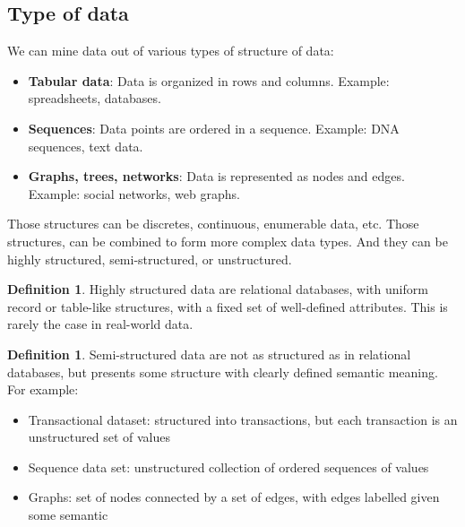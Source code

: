 \documentclass[12pt, openany]{report}
\theoremstyle{definition}
\newtheorem{definition}[thm]{Definition}
\begin{document}
\subsection{Type of data}
We can mine data out of various types of structure of data:
\begin{itemize}
    \item \textbf{Tabular data}: Data is organized in rows and columns. Example: spreadsheets, databases.
    \item \textbf{Sequences}: Data points are ordered in a sequence. Example: DNA sequences, text data.
    \item \textbf{Graphs, trees, networks}: Data is represented as nodes and edges. Example: social networks, web graphs.
\end{itemize}
Those structures can be discretes, continuous, enumerable data, etc. Those structures, can be combined to form more complex data types. And they can be highly structured, semi-structured, or unstructured.
\begin{definition}
    Highly structured data are relational databases, with uniform record or table-like structures, with a fixed set of well-defined attributes. This is rarely the case in real-world data.
\end{definition}
\begin{definition}
    Semi-structured data are not as structured as in relational databases, but presents some structure with clearly defined semantic meaning. For example:
    \begin{itemize}
        \item Transactional dataset: structured into transactions, but each transaction is an unstructured set of values
        \item Sequence data set: unstructured collection of ordered sequences of values
        \item Graphs: set of nodes connected by a set of edges, with edges labelled given some semantic
    \end{itemize}
\end{definition}
\end{document}
